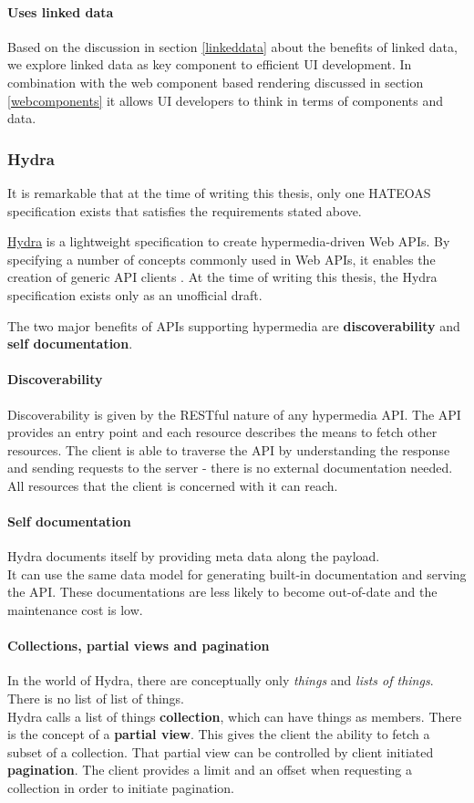 \paragraph{Uses linked data}
Based on the discussion in section \ref{linkeddata} about the benefits of linked data, we explore linked data as key component to efficient UI development. In combination with the web component based rendering discussed in section \ref{webcomponents} it allows UI developers to think in terms of components and data.

\subsubsection{Hydra}
It is remarkable that at the time of writing this thesis, only one HATEOAS specification exists that satisfies the requirements stated above.

\href{http://www.hydra-cg.com/}{Hydra} is a lightweight specification to create hypermedia-driven Web APIs. By specifying a number of concepts commonly used in Web APIs, it enables the creation of generic API clients \citep{hydraspecs}. At the time of writing this thesis, the Hydra specification exists only as an unofficial draft.

The two major benefits of APIs supporting hypermedia are \textbf{discoverability} and \textbf{self documentation}. \\
\paragraph{Discoverability} Discoverability is given by the RESTful nature of any hypermedia API. The API provides an entry point and each resource describes the means to fetch other resources. The client is able to traverse the API by understanding the response and sending requests to the server - there is no external documentation needed. All resources that the client is concerned with it can reach.

\paragraph{Self documentation}
Hydra documents itself by providing meta data along the payload. \\
It can use the same data model for generating built-in documentation and serving the API. These documentations are less likely to become out-of-date and the maintenance cost is low.

\paragraph{Collections, partial views and pagination}
In the world of Hydra, there are conceptually only \textit{things} and \textit{lists of things}. There is no list of list of things. \\
Hydra calls a list of things \textbf{collection}, which can have things as members. There is the concept of a \textbf{partial view}. This gives the client the ability to fetch a subset of a collection. That partial view can be controlled by client initiated \textbf{\gls{pagination}}. The client provides a limit and an offset when requesting a collection in order to initiate pagination.

